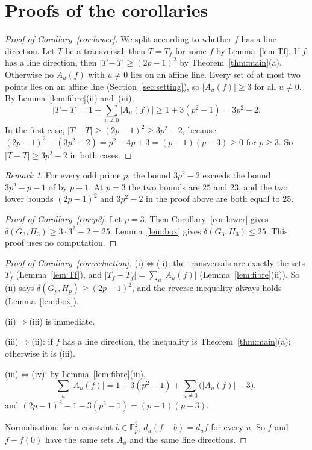 \documentclass[11pt]{amsart}
\theoremstyle{definition}\newtheorem{definition}[theorem]{Definition}
\theoremstyle{remark}\newtheorem{remark}[theorem]{Remark}
\newcommand{\F}{\mathbb{F}}
\newcommand{\abs}[1]{\lvert #1\rvert}
\begin{document}
\section{Proofs of the corollaries}\label{sec:corollaries}

\begin{proof}[Proof of Corollary~\ref{cor:lower}]
We split according to whether \(f\) has a line direction.
Let \(T\) be a transversal; then \(T=T_f\) for some \(f\) by Lemma~\ref{lem:Tf}.
If \(f\) has a line direction, then \(\abs{T-T}\ge(2p-1)^2\) by Theorem~\ref{thm:main}(a).
Otherwise no \(A_u(f)\) with \(u\ne0\) lies on an affine line.
Every set of at most two points lies on an affine line (Section~\ref{sec:setting}), so \(\abs{A_u(f)}\ge3\) for all \(u\ne0\).
By Lemma~\ref{lem:fibre}(ii) and~(iii),
\[
\abs{T-T}=1+\sum_{u\ne0}\abs{A_u(f)}\ge1+3(p^2-1)=3p^2-2 .
\]
In the first case, \(\abs{T-T}\ge(2p-1)^2\ge3p^2-2\), because \((2p-1)^2-(3p^2-2)=p^2-4p+3=(p-1)(p-3)\ge0\) for \(p\ge3\).
So \(\abs{T-T}\ge3p^2-2\) in both cases.
\end{proof}

\begin{remark}\label{rem:compare}
For every odd prime \(p\), the bound \(3p^2-2\) exceeds the bound \(3p^2-p-1\) of \cite[Theorem~6.5]{BPT} by \(p-1\).
At \(p=3\) the two bounds are \(25\) and \(23\), and the two lower bounds \((2p-1)^2\) and \(3p^2-2\) in the proof above are both equal to \(25\).
\end{remark}

\begin{proof}[Proof of Corollary~\ref{cor:p3}]
Let \(p=3\).
Then Corollary~\ref{cor:lower} gives \(\delta(G_3,H_3)\ge3\cdot3^2-2=25\).
Lemma~\ref{lem:box} gives \(\delta(G_3,H_3)\le25\).
This proof uses no computation.
\end{proof}

\begin{proof}[Proof of Corollary~\ref{cor:reduction}]
(i)\(\Leftrightarrow\)(ii): the transversals are exactly the sets \(T_f\) (Lemma~\ref{lem:Tf}), and \(\abs{T_f-T_f}=\sum_u\abs{A_u(f)}\) (Lemma~\ref{lem:fibre}(ii)).
So (ii) says \(\delta(G_p,H_p)\ge(2p-1)^2\), and the reverse inequality always holds (Lemma~\ref{lem:box}).

(ii)\(\Rightarrow\)(iii) is immediate.

(iii)\(\Rightarrow\)(ii): if \(f\) has a line direction, the inequality is Theorem~\ref{thm:main}(a); otherwise it is (iii).

(iii)\(\Leftrightarrow\)(iv): by Lemma~\ref{lem:fibre}(iii),
\[
\sum_u\abs{A_u(f)}=1+3(p^2-1)+\sum_{u\ne0}\bigl(\abs{A_u(f)}-3\bigr),
\]
and \((2p-1)^2-1-3(p^2-1)=(p-1)(p-3)\).

Normalisation: for a constant \(b\in\F_p^2\), \(d_u(f-b)=d_uf\) for every \(u\).
So \(f\) and \(f-f(0)\) have the same sets \(A_u\) and the same line directions.
\end{proof}
\end{document}
